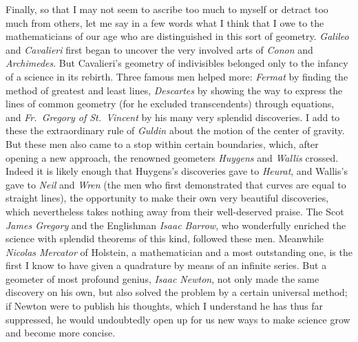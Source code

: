 \documentclass[polutonikogreek,english,twoside,openright]{article}
\begin{document}
Finally, so that I may not seem to ascribe too much to myself or detract too
much from others, let me say in a few words what I think that I owe to the
mathematicians of our age who are distinguished in this sort of geometry.
{\em Galileo} and {\em Cavalieri} first began to uncover the very involved
arts of {\em Conon} and {\em Archimedes}.  But Cavalieri's geometry of
indivisibles belonged only to the infancy of a science in its rebirth.  Three
famous men helped more: {\em Fermat} by finding the method of greatest and
least lines, {\em Descartes} by showing the way to express the lines of common
geometry (for he excluded transcendents) through equations, and {\em Fr.\
Gregory of St.\ Vincent} by his many very splendid discoveries.  I add to
these the extraordinary rule of {\em Guldin} about the motion of the center of
gravity.  But these men also came to a stop within certain boundaries, which,
after opening a new approach, the renowned geometers {\em Huygens} and
{\em Wallis} crossed.  Indeed it is likely enough that Huygens's discoveries
gave to {\em Heurat}, and Wallis's gave to {\em Neil} and {\em Wren} (the men
who first demonstrated that curves are equal to straight lines), the
opportunity to make their own very beautiful discoveries, which nevertheless
takes nothing away from their well-deserved praise.  The Scot {\em James
Gregory} and the Englishman {\em Isaac Barrow}, who wonderfully enriched the
science with splendid theorems of this kind, followed these men.  Meanwhile
{\em Nicolas Mercator} of Holstein, a mathematician and a most outstanding
one, is the first I know to have given a quadrature by means of an infinite
series.  But a geometer of most profound genius, {\em Isaac Newton}, not only
made the same discovery on his own, but also solved the problem by a certain
universal method; if Newton were to publish his thoughts, which I understand
he has thus far suppressed, he would undoubtedly open up for us new ways to
make science grow and become more concise.
\end{document}
